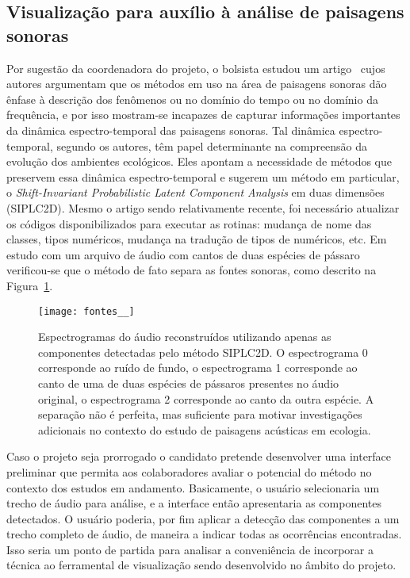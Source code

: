 \documentclass[a4paper, 11pt]{article}
\begin{document}
\subsection{Visualização para auxílio à análise de paisagens sonoras}\label{pa}
Por sugestão da coordenadora do projeto,
o bolsista estudou um artigo~\cite{eld} cujos autores argumentam que os métodos em uso na área de paisagens sonoras dão ênfase à descrição dos fenômenos ou no domínio do tempo ou no domínio da frequência, e por isso mostram-se incapazes de capturar informações importantes da dinâmica espectro-temporal das paisagens sonoras. Tal dinâmica espectro-temporal, segundo os autores, têm papel determinante na compreensão da evolução dos ambientes ecológicos.
Eles apontam a necessidade de métodos que preservem essa dinâmica espectro-temporal e sugerem um método em particular, o \emph{Shift-Invariant Probabilistic Latent Component Analysis} em duas dimensões (SIPLC2D).
Mesmo o artigo sendo relativamente recente, foi necessário atualizar os códigos disponibilizados para executar as rotinas: mudança de nome das classes, tipos numéricos, mudança na tradução de tipos de numéricos, etc.
Em estudo com um arquivo de áudio com cantos de duas espécies de pássaro verificou-se que o método de fato separa as fontes sonoras, como descrito na Figura~\ref{ps}.
\begin{figure}[h!]
\centering
  \texttt{[image: fontes\_\_]}
\caption{%
  Espectrogramas do áudio reconstruídos utilizando apenas
  as componentes detectadas pelo método SIPLC2D.
  O espectrograma 0 corresponde ao ruído de fundo,
  o espectrograma 1 corresponde ao canto de uma de duas espécies de pássaros
  presentes no áudio original,
  o espectrograma 2 corresponde ao canto da outra espécie.
  A separação não é perfeita, mas suficiente para motivar investigações adicionais no contexto do estudo de paisagens acústicas em ecologia.
}\label{ps}
\end{figure}

Caso o projeto seja prorrogado o candidato pretende desenvolver uma interface preliminar que permita aos colaboradores avaliar o potencial do método no contexto dos estudos em andamento.
Basicamente, o usuário selecionaria um trecho de áudio para análise, e a interface
então apresentaria as componentes detectados.
O usuário poderia, por fim aplicar a detecção das componentes a um trecho completo de áudio,
de maneira a indicar todas as ocorrências encontradas. Isso seria um ponto de partida para analisar a conveniência de incorporar a técnica ao ferramental de visualização sendo desenvolvido no âmbito do projeto.
\end{document}
